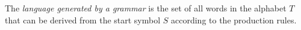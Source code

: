 

\setcounter{section}{5}
\setcounter{subsection}{1}
\setcounter{dfn}{2}

\begin{dfn}
The \emph{language generated by a grammar} is the set of all words in the alphabet $T$ that can be derived from the start symbol $S$
according to the production rules.
\end{dfn}


